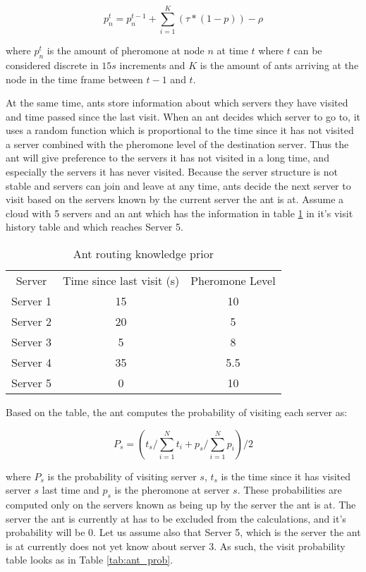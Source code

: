 \begin{equation}
p^{t}_{n} = p^{t-1}_{n} + \sum_{i=1}^{K}(\tau * (1 - p)) - \rho
\end{equation}

where $p^{t}_{n}$ is the amount of pheromone at node $n$ at time $t$ where $t$ can be considered discrete in $15s$ increments and $K$ is the amount of ants arriving at the node in the time frame between $t-1$ and $t$.

At the same time, ants store information about which servers they have visited and time passed since the last visit. When an ant decides which server to go to, it uses a random function which is proportional to the time since it has not visited a server combined with the pheromone level of the destination server. Thus the ant will give preference to the servers it has not visited in a long time, and especially the servers it has never visited. Because the server structure is not stable and servers can join and leave at any time, ants decide the next server to visit based on the servers known by the current server the ant is at.  Assume a cloud with 5 servers and an ant which has the information in table \ref{tab:ant_prio} in it's visit history table and which reaches Server 5.

\begin{table}
\centering
\begin{tabular}{c|c|c}
Server & Time since last visit (s) & Pheromone Level \\
Server 1 & 15 & 10 \\ 
Server 2 & 20 & 5 \\
Server 3 & 5 & 8 \\
Server 4 & 35 & 5.5 \\
Server 5 & 0 & 10 \\
\end{tabular}
\caption{Ant routing knowledge prior}
\label{tab:ant_prio}
\end{table}

Based on the table, the ant computes the probability of visiting each server as:

\begin{equation}
P_s = (t_s / \sum_{i=1}^{N} t_i + p_{s} / \sum_{i=1}^{N} p_i) / 2
\end{equation}

where $P_s$ is the probability of visiting server $s$, $t_s$ is the time since it has visited server $s$ last time and $p_{s}$ is the pheromone at server $s$. These probabilities are computed only on the servers known as being up by the server the ant is at. The server the ant is currently at has to be excluded from the calculations, and it's probability will be 0. Let us assume also that Server 5, which is the server the ant is at currently does not yet know about server 3. As such, the visit probability table looks as in Table \ref{tab:ant_prob}.

